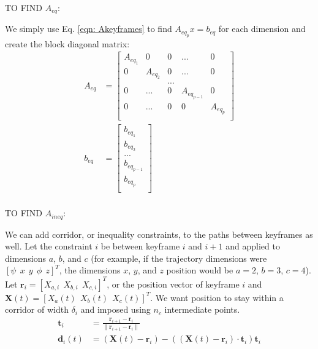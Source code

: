 \documentclass[11pt]{article}
\begin{document}
\mbox{} \newline
\mbox{} \newline
TO FIND $A_{eq}$: \newline

We simply use Eq. \ref{eqn: Akeyframes} to find $A_{eq_p} x = b_{eq} $ for each dimension and create the block diagonal matrix:
\begin{align}
\label{eqn: Aeqdim} A_{eq} &= 
\begin{bmatrix}
  A_{eq_1} & 0 & 0 & ... & 0 \\
  0 & A_{eq_2} & 0 & ... & 0 \\
  & & ... & &  \\
  0 & ... & 0 & A_{eq_{p-1}} & 0 \\
  0 & ... & 0 & 0 & A_{eq_p} \\ 
 \end{bmatrix} \\
 \nonumber b_{eq} &= 
 \begin{bmatrix}
  b_{eq_1}  \\
  b_{eq_2}  \\
  ... \\
    b_{eq_{p-1}}  \\
      b_{eq_p}  \\
 \end{bmatrix} \\
\end{align}





\mbox{} \newline
\mbox{} \newline
TO FIND $A_{ineq}$: \newline

We can add corridor, or inequality constraints, to the paths between keyframes as well. Let the constraint $i$ be between keyframe $i$ and $i+1$ and applied to dimensions $a$, $b$, and $c$ (for example, if the trajectory dimensions were $[\psi \ \ x \ \ y \ \ \phi \ \ z]^T$, the dimensions $x$, $y$, and $z$ position would be $a = 2$, $b=3$, $c=4$). Let $\mathbf{r}_i = [X_{a, i} \ \ X_{b, i} \ \ X_{c, i}]^T$, or the position vector of keyframe $i$ and $\mathbf{X} (t) = [X_a (t) \ \ X_b (t) \ \ X_{c}(t)]^T$. We want position to stay within a corridor of width $\delta_i$ and imposed using $n_c$ intermediate points. 
\begin{align*}
\mathbf{t}_i &= \frac{ \mathbf{r}_{i+1} - \mathbf{r}_i } { \| \mathbf{r}_{i+1} - \mathbf{r}_i \| } \\
\mathbf{d}_i (t) &= (\mathbf{X}(t) - \mathbf{r}_i) - ((\mathbf{X}(t) - \mathbf{r}_i) \cdot \mathbf{t}_i) \mathbf{t}_i
\end{align*}
\end{document}
